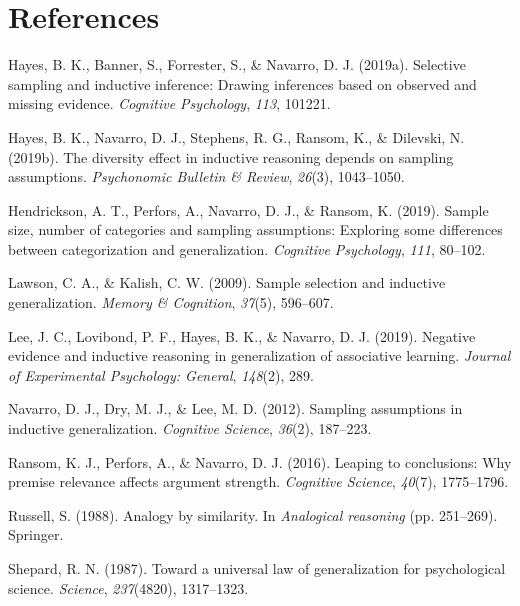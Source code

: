 \documentclass[english,doc]{apa6}
\begin{document}
\hypertarget{references}{%
\section{References}\label{references}}

\hypertarget{refs}{}
\leavevmode\hypertarget{ref-hayes2019selective}{}%
Hayes, B. K., Banner, S., Forrester, S., \& Navarro, D. J. (2019a). Selective sampling and inductive inference: Drawing inferences based on observed and missing evidence. \emph{Cognitive Psychology}, \emph{113}, 101221.

\leavevmode\hypertarget{ref-hayes2019diversity}{}%
Hayes, B. K., Navarro, D. J., Stephens, R. G., Ransom, K., \& Dilevski, N. (2019b). The diversity effect in inductive reasoning depends on sampling assumptions. \emph{Psychonomic Bulletin \& Review}, \emph{26}(3), 1043--1050.

\leavevmode\hypertarget{ref-hendrickson2019sample}{}%
Hendrickson, A. T., Perfors, A., Navarro, D. J., \& Ransom, K. (2019). Sample size, number of categories and sampling assumptions: Exploring some differences between categorization and generalization. \emph{Cognitive Psychology}, \emph{111}, 80--102.

\leavevmode\hypertarget{ref-lawson2009sample}{}%
Lawson, C. A., \& Kalish, C. W. (2009). Sample selection and inductive generalization. \emph{Memory \& Cognition}, \emph{37}(5), 596--607.

\leavevmode\hypertarget{ref-lee2019negative}{}%
Lee, J. C., Lovibond, P. F., Hayes, B. K., \& Navarro, D. J. (2019). Negative evidence and inductive reasoning in generalization of associative learning. \emph{Journal of Experimental Psychology: General}, \emph{148}(2), 289.

\leavevmode\hypertarget{ref-navarro2012sampling}{}%
Navarro, D. J., Dry, M. J., \& Lee, M. D. (2012). Sampling assumptions in inductive generalization. \emph{Cognitive Science}, \emph{36}(2), 187--223.

\leavevmode\hypertarget{ref-ransom2016leaping}{}%
Ransom, K. J., Perfors, A., \& Navarro, D. J. (2016). Leaping to conclusions: Why premise relevance affects argument strength. \emph{Cognitive Science}, \emph{40}(7), 1775--1796.

\leavevmode\hypertarget{ref-russell1988analogy}{}%
Russell, S. (1988). Analogy by similarity. In \emph{Analogical reasoning} (pp. 251--269). Springer.

\leavevmode\hypertarget{ref-shepard1987toward}{}%
Shepard, R. N. (1987). Toward a universal law of generalization for psychological science. \emph{Science}, \emph{237}(4820), 1317--1323.
\end{document}

